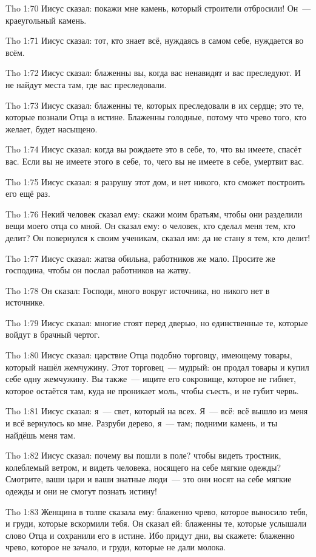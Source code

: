 \vs Tho 1:70
Иисус сказал:
покажи мне камень, который строители отбросили!
Он~--- краеугольный камень.

\vs Tho 1:71
Иисус сказал:
тот, кто знает всё, нуждаясь в самом себе, нуждается во всём.

\vs Tho 1:72
Иисус сказал:
блаженны вы, когда вас ненавидят и вас преследуют.
И не найдут места там, где вас преследовали.

\vs Tho 1:73
Иисус сказал:
блаженны те, которых преследовали в их сердце;
это те, которые познали Отца в истине.
Блаженны голодные, потому что чрево того, кто желает, будет насыщено.

\vs Tho 1:74
Иисус сказал:
когда вы рождаете это в себе, то, что вы имеете, спасёт вас.
Если вы не имеете этого в себе, то, чего вы не имеете в себе,
умертвит вас.

\vs Tho 1:75
Иисус сказал:
я разрушу этот дом, и нет никого, кто сможет построить его ещё раз.

\vs Tho 1:76
Некий человек сказал ему:
скажи моим братьям, чтобы они разделили вещи моего отца со мной.
Он сказал ему: о человек, кто сделал меня тем, кто делит?
Он повернулся к своим ученикам, сказал им:
да не стану я тем, кто делит!

\vs Tho 1:77
Иисус сказал:
жатва обильна, работников же мало.
Просите же господина, чтобы он послал работников на жатву.

\vs Tho 1:78
Он сказал:
Господи, много вокруг источника, но никого нет в источнике.

\vs Tho 1:79
Иисус сказал:
многие стоят перед дверью, но единственные те,
которые войдут в брачный чертог.

\vs Tho 1:80
Иисус сказал:
царствие Отца подобно торговцу, имеющему товары,
который нашёл жемчужину.
Этот торговец~--- мудрый:
он продал товары и купил себе одну жемчужину.
Вы также~--- ищите его сокровище, которое не гибнет,
которое остаётся там, куда не проникает моль, чтобы съесть,
и не губит червь.

\vs Tho 1:81
Иисус сказал:
я~--- свет, который на всех.
Я~--- всё: всё вышло из меня и всё вернулось ко мне.
Разруби дерево, я~--- там;
подними камень, и ты найдёшь меня там.

\vs Tho 1:82
Иисус сказал:
почему вы пошли в поле?
чтобы видеть тростник, колеблемый ветром, и видеть человека,
носящего на себе мягкие одежды?
Смотрите, ваши цари и ваши знатные люди~--- это они носят на себе мягкие
одежды и они не смогут познать истину!

\vs Tho 1:83
Женщина в толпе сказала ему:
блаженно чрево, которое выносило тебя, и груди, которые вскормили тебя.
Он сказал ей:
блаженны те, которые услышали слово Отца и сохранили его в истине.
Ибо придут дни, вы скажете:
блаженно чрево, которое не зачало, и груди, которые не дали молока.

